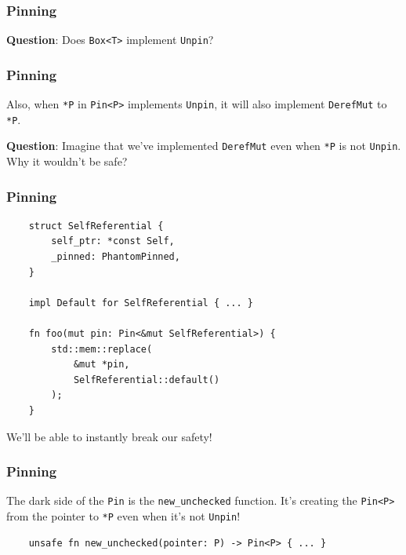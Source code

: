 \documentclass[aspectratio=1610,t]{beamer}
\begin{document}
\begin{frame}[fragile]
\frametitle{Pinning}
\textbf{Question}: Does \texttt{Box<T>} implement \texttt{Unpin}?

\end{frame}


\begin{frame}[fragile]
\frametitle{Pinning}
Also, when \texttt{*P} in \texttt{Pin<P>} implements \texttt{Unpin}, it will also implement \texttt{DerefMut} to \texttt{*P}.

\textbf{Question}: Imagine that we've implemented \texttt{DerefMut} even when \texttt{*P} is not \texttt{Unpin}. Why it wouldn't be safe?
\end{frame}


\begin{frame}[fragile]
\frametitle{Pinning}
\begin{verbatim}
    struct SelfReferential {
        self_ptr: *const Self,
        _pinned: PhantomPinned,
    }

    impl Default for SelfReferential { ... }

    fn foo(mut pin: Pin<&mut SelfReferential>) {
        std::mem::replace(
            &mut *pin,
            SelfReferential::default()
        );
    }
\end{verbatim}

We'll be able to instantly break our safety!
\end{frame}


\begin{frame}[fragile]
\frametitle{Pinning}
The dark side of the \texttt{Pin} is the \texttt{new\_unchecked} function. It's creating the \texttt{Pin<P>} from the pointer to \texttt{*P} even when it's not \texttt{Unpin}!

\begin{verbatim}
    unsafe fn new_unchecked(pointer: P) -> Pin<P> { ... }
\end{verbatim}
\end{frame}
\end{document}
